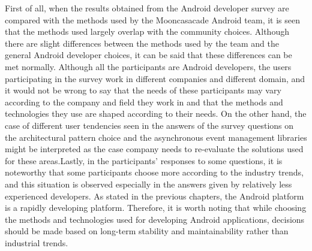 First of all, when the results obtained from the Android developer survey are compared with the methods used by the Mooncasacade Android team, it is seen that the methods used largely overlap with the community choices. Although there are slight differences between the methods used by the team and the general Android developer choices, it can be said that these differences can be met normally. Although all the participants are Android developers, the users participating in the survey work in different companies and different domain, and it would not be wrong to say that the needs of these participants may vary according to the company and field they work in and that the methods and technologies they use are shaped according to their needs. On the other hand, the case of different user tendencies seen in the answers of the survey questions on the architectural pattern choice and the asynchronous event management libraries might be interpreted as the case company needs to re-evaluate the solutions used for these areas.Lastly, in the participants' responses to some questions, it is noteworthy that some participants choose more according to the industry trends, and this situation is observed especially in the answers given by relatively less experienced developers. As stated in the previous chapters, the Android platform is a rapidly developing platform. Therefore, it is worth noting that while choosing the methods and technologies used for developing Android applications, decisions should be made based on long-term stability and maintainability rather than industrial trends.

